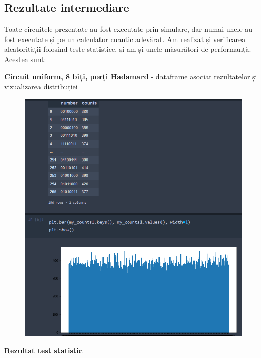 \documentclass[12pt]{report}
\begin{document}
\subsection*{Rezultate intermediare}
Toate circuitele prezentate au fost executate prin simulare, dar numai unele au fost executate și pe un calculator cuantic adevărat. Am realizat și verificarea aleatorității folosind teste statistice, și am și unele măsurători de performanță. Acestea sunt:

\textbf{Circuit uniform, 8 biți, porți Hadamard} - dataframe asociat rezultatelor și vizualizarea distribuției

\begin{figure}[H]
    \centering
    \includegraphics[scale=0.8]{anexe/figuri/Uniform8BitiEu.png}
    \caption{}
    \label{fig:Uniform8BitiEu}
\end{figure}

\textbf{Rezultat test statistic}
\end{document}

